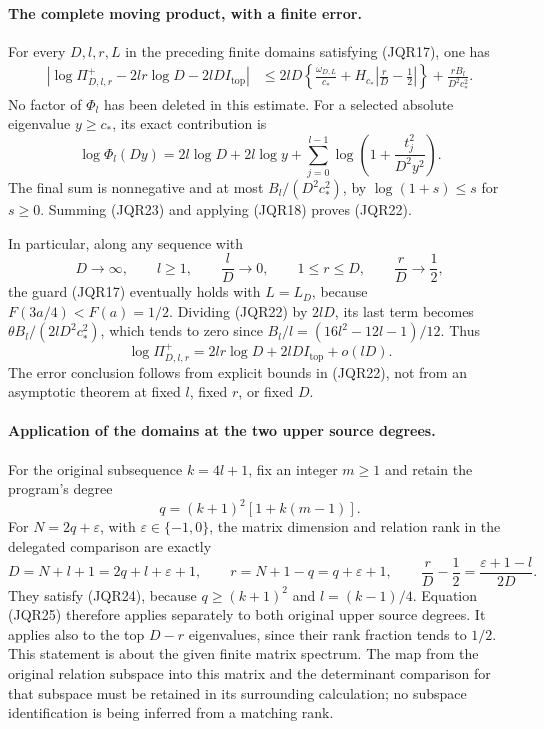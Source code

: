 \documentclass[11pt,a4paper]{article}
\begin{document}
\paragraph{The complete moving product, with a finite error.}
For every \(D,l,r,L\) in the preceding finite domains satisfying
(JQR17), one has
\[
 \begin{split}
 \left|\log\Pi^+_{D,l,r}
       -2lr\log D-2lD I_{\mathrm{top}}\right|
 &\leq 2lD\left\{\frac{\omega_{D,L}}{c_*}+
           H_{c_*}\left|\frac rD-\frac12\right|\right\}
       +\frac{rB_l}{D^2c_*^2}.
 \end{split}
 \tag{JQR22}
\]
No factor of \(\Phi_l\) has been deleted in this estimate.
For a selected absolute eigenvalue \(y\geq c_*\), its exact contribution
is
\[
 \log\Phi_l(Dy)
 =2l\log D+2l\log y+
    \sum_{j=0}^{l-1}\log\left(1+\frac{t_j^2}{D^2y^2}\right).
 \tag{JQR23}
\]
The final sum is nonnegative and at most \(B_l/(D^2c_*^2)\), by
\(\log(1+s)\leq s\) for \(s\geq0\).  Summing (JQR23) and applying
(JQR18) proves (JQR22).

In particular, along any sequence with
\[
 D\longrightarrow\infty,\qquad
 l\geq1,\qquad \frac lD\longrightarrow0,\qquad
 1\leq r\leq D,\qquad \frac rD\longrightarrow\frac12,
 \tag{JQR24}
\]
the guard (JQR17) eventually holds with \(L=L_D\), because
\(F(3a/4)<F(a)=1/2\).
Dividing (JQR22) by \(2lD\), its last term becomes
\(\theta B_l/(2lD^2c_*^2)\), which tends to zero since
\(B_l/l=(16l^2-12l-1)/12\).
Thus
\[
 \boxed{\displaystyle
 \log\Pi^+_{D,l,r}
     =2lr\log D+2lD I_{\mathrm{top}}+o(lD).}
 \tag{JQR25}
\]
The error conclusion follows from explicit bounds in (JQR22), not
from an asymptotic theorem at fixed \(l\), fixed \(r\), or fixed \(D\).

\paragraph{Application of the domains at the two upper source degrees.}
For the original subsequence \(k=4l+1\), fix an integer \(m\geq1\)
and retain the program's degree
\[
 q=(k+1)^2[1+k(m-1)].
 \tag{JQR26}
\]
For \(N=2q+\varepsilon\), with
\(\varepsilon\in\{-1,0\}\), the matrix dimension and relation rank
in the delegated comparison are exactly
\[
 D=N+l+1=2q+l+\varepsilon+1,\qquad
 r=N+1-q=q+\varepsilon+1,\qquad
 \frac rD-\frac12=\frac{\varepsilon+1-l}{2D}.
 \tag{JQR27}
\]
They satisfy (JQR24), because \(q\geq(k+1)^2\) and
\(l=(k-1)/4\).  Equation (JQR25) therefore applies separately to
both original upper source degrees.  It applies also to the top
\(D-r\) eigenvalues, since their rank fraction tends to \(1/2\).
This statement is about the given finite matrix spectrum.  The map
from the original relation subspace into this matrix and the determinant
comparison for that subspace must be retained in its surrounding
calculation; no subspace identification is being inferred from a
matching rank.
\end{document}
